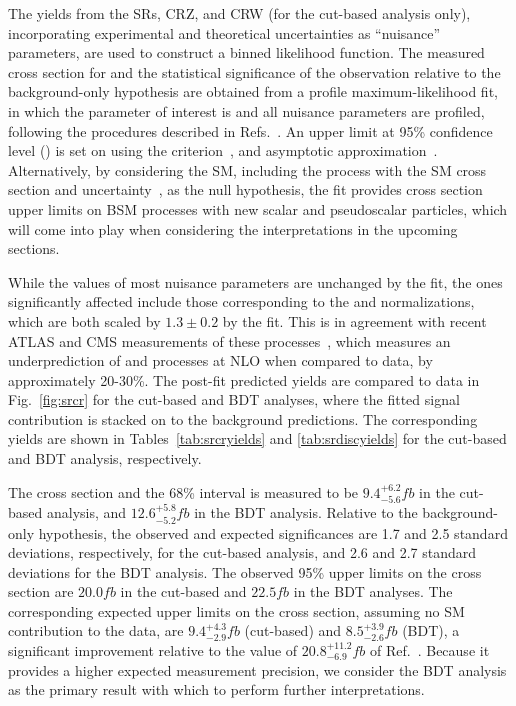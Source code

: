 The yields from the SRs, CRZ, and CRW (for the cut-based analysis only),
incorporating experimental and theoretical uncertainties as ``nuisance''
parameters, are used to construct a binned likelihood function.
The measured cross
section for \tttt and the statistical significance of the observation relative to the
background-only hypothesis are obtained from a profile maximum-likelihood
fit, in which the parameter of interest is \xsectttt and all nuisance
parameters are profiled, following the procedures described in
Refs.~\cite{STAT:ATLPHYSPUB2011011,STAT:PDG}. 
An upper limit at 95\%
confidence level (\CL) is set on \xsectttt using the 
\CLs criterion~\cite{STAT:Junk1999kv,STAT:Read2002hq}, 
and asymptotic approximation~\cite{STAT:Cowan2010js}. 
Alternatively, by considering the SM, including the \tttt process with the SM
cross section and uncertainty~\cite{THEORY:Frederix2017wme}, as the null
hypothesis, the fit provides cross section upper limits on BSM processes with
new scalar and pseudoscalar particles, which will come into play when
considering the interpretations in the upcoming sections.

While the values of most nuisance parameters are unchanged by the
fit, the ones significantly affected include those corresponding to the
\ttW and \ttZ normalizations, which are both scaled by $1.3\pm0.2$ by the
fit. This is in agreement with recent ATLAS and CMS measurements of these
processes~\cite{ATLAS:Aaboud2019njj, CMS:Sirunyan2017uzs, CMS:2019too}, which
measures an underprediction of \ttW and \ttZ processes at NLO when compared to
data, by approximately 20-30\%. The
post-fit predicted yields are compared to
data in Fig.~\ref{fig:srcr} for the cut-based and BDT 
analyses, where the fitted \tttt signal contribution is stacked on to the
background predictions. The corresponding yields are shown in
Tables~\ref{tab:srcryields} and \ref{tab:srdiscyields} for the cut-based and
BDT analysis, respectively.

The \tttt cross section and the 68\% \CL interval is measured to be
$9.4^{+6.2}_{-5.6}\unit{fb}$ in the cut-based analysis, and
$12.6^{+5.8}_{-5.2}\unit{fb}$ in the BDT analysis. Relative to the
background-only hypothesis, the observed and expected significances are 1.7
and 2.5 standard deviations, respectively, for the cut-based analysis, and
2.6 and 2.7 standard deviations for the BDT analysis. The observed 95\% \CL
upper limits on the cross section are $20.0\unit{fb}$ in the cut-based and
$22.5\unit{fb}$ in the BDT analyses. The corresponding expected upper limits
on the \tttt cross section, assuming no SM \tttt contribution to the data,
are $9.4^{+4.3}_{-2.9}\unit{fb}$ (cut-based) and $8.5^{+3.9}_{-2.6}\unit{fb}$
(BDT), a significant improvement relative to the value of
$20.8^{+11.2}_{-6.9}\unit{fb}$ of Ref.~\cite{CMS:myTOP2016}. Because it 
provides a higher expected measurement precision, we consider the BDT
analysis as the primary result with which to perform further interpretations.

